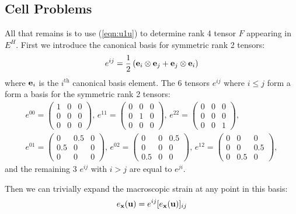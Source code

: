 \documentclass[10pt]{article}
\begin{document}
\subsection{Cell Problems}
All that remains is to use (\ref{eqn:u1u}) to determine rank 4 tensor $F$
appearing in $E^H$. First we introduce the canonical basis for symmetric rank 2 tensors:
$$
e^{ij} = \frac{1}{2} \left({\bf e}_i \otimes {\bf e}_j + {\bf e}_j \otimes {\bf e}_i \right)
$$
where ${\bf e}_i$ is the $i^\text{th}$ canonical basis element.
The 6 tensors $e^{ij}$ where $i \le j$ form a form a basis for the symmetric rank 2 tensors:
\begin{gather*}
e^{00} =
\begin{pmatrix}
        1 & 0 & 0 \\
        0 & 0 & 0 \\
        0 & 0 & 0
\end{pmatrix},\,
e^{11} =
\begin{pmatrix}
        0 & 0 & 0 \\
        0 & 1 & 0 \\
        0 & 0 & 0
\end{pmatrix},\,
e^{22} =
\begin{pmatrix}
        0 & 0 & 0 \\
        0 & 0 & 0 \\
        0 & 0 & 1
\end{pmatrix}, \\
e^{01} =
\begin{pmatrix}
        0 & 0.5 & 0 \\
        0.5 & 0 & 0 \\
        0 & 0 & 0
\end{pmatrix},\,
e^{02} =
\begin{pmatrix}
        0 & 0 & 0.5 \\
        0 & 0 & 0 \\
        0.5 & 0 & 0
\end{pmatrix},\,
e^{12} =
\begin{pmatrix}
        0 & 0 & 0 \\
        0 & 0 & 0.5 \\
        0 & 0.5 & 0
\end{pmatrix},
\end{gather*}
and the remaining 3 $e^{ij}$ with $i > j$ are equal to $e^{ji}$.

Then we can trivially expand the macroscopic strain at any point in this basis:
$$
e_{\bf x}({\bf u}) = e^{ij} [e_{\bf x}({\bf u})]_{ij}
$$
\end{document}
